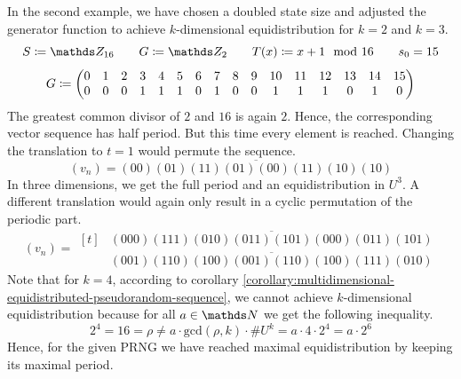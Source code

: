 \documentclass{stdlocal}
\begin{document}
  \noindent
  In the second example, we have chosen a doubled state size and adjusted the generator function to achieve $k$-dimensional equidistribution for $k=2$ and $k=3$.
  \[
    S \define \setInteger_{16}
    \separate
    G \define \setInteger_2
    \separate
    T(x) \define x + 1 \mod 16
    \separate
    s_0 = 15
  \]
  \[
    \setcounter{MaxMatrixCols}{20}
    G \define
    \begin{pmatrix}
      0 & 1 & 2 & 3 & 4 & 5 & 6 & 7 & 8 & 9 & 10 & 11 & 12 & 13 & 14 & 15 \\
      0 & 0 & 0 & 1 & 1 & 1 & 0 & 1 & 0 & 0 & 1 & 1 & 1 & 0 & 1 & 0
    \end{pmatrix}
  \]
  The greatest common divisor of $2$ and $16$ is again $2$.
  Hence, the corresponding vector sequence has half period.
  But this time every element is reached.
  Changing the translation to $t=1$ would permute the sequence.
  \[
    (v_n) = \overline{(00)(01)(11)(01)(00)(11)(10)(10)}
  \]
  In three dimensions, we get the full period and an equidistribution in $U^3$.
  A different translation would again only result in a cyclic permutation of the periodic part.
  \[
    (v_n) =
    \begin{aligned}[t]
      &\overline{(000)(111)(010)(011)(101)(000)(011)(101)} \\
      &\overline{(001)(110)(100)(001)(110)(100)(111)(010)}
    \end{aligned}
  \]
  Note that for $k=4$, according to corollary \ref{corollary:multidimensional-equidistributed-pseudorandom-sequence}, we cannot achieve $k$-dimensional equidistribution because for all $a\in\setNatural$ we get the following inequality.
  \[
    2^4 = 16 = ρ \neq a\cdot\mathrm{gcd}(ρ,k)\cdot\# U^k = a \cdot 4 \cdot 2^4 = a\cdot 2^6
  \]
  Hence, for the given PRNG we have reached maximal equidistribution by keeping its maximal period.

\end{document}
